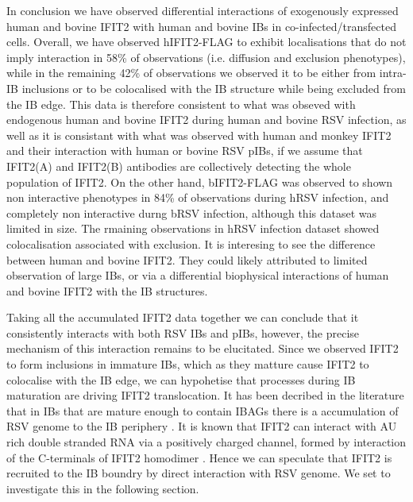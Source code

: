 In conclusion we have observed differential interactions of exogenously expressed human and bovine IFIT2 with human and bovine IBs in co-infected/transfected cells. Overall, we have observed hIFIT2-FLAG to exhibit localisations that do not imply interaction in 58\% of observations (i.e. diffusion and exclusion phenotypes), while in the remaining 42\% of observations we observed it to be either from intra-IB inclusions or to be colocalised with the IB structure while being excluded from the IB edge. This data is therefore consistent to what was obseved with endogenous human and bovine IFIT2 during human and bovine RSV infection, as well as it is consistant with what was observed with human and monkey IFIT2 and their interaction with human or bovine RSV pIBs, if we assume that IFIT2(A) and IFIT2(B) antibodies are collectively detecting the whole population of IFIT2. On the other hand, bIFIT2-FLAG was observed to shown non interactive phenotypes in 84\% of observations during hRSV infection, and completely non interactive durng bRSV infection, although this dataset was limited in size. The rmaining observations in hRSV infection dataset showed colocalisation associated with exclusion. It is interesing to see the difference between human and bovine IFIT2. They could likely attributed to limited observation of large IBs, or via a differential biophysical interactions of human and bovine IFIT2 with the IB structures.

Taking all the accumulated IFIT2 data together we can conclude that it consistently interacts with both RSV IBs and pIBs, however, the precise mechanism of this interaction remains to be elucitated. Since we observed IFIT2 to form inclusions in immature IBs, which as they matture cause IFIT2 to colocalise with the IB edge, we can hypohetise that processes during IB maturation are driving IFIT2 translocation. It has been decribed in the literature that in IBs that are mature enough to contain IBAGs there is a accumulation of RSV genome to the IB periphery \cite{Rincheval2017FunctionalVirus}. It is known that IFIT2 can interact with AU rich double stranded RNA via a positively charged channel, formed by interaction of the C-terminals of IFIT2 homodimer \cite{Yang2012CrystalMechanisms, Vladimer2014IFITs:Proteins}. Hence we can speculate that IFIT2 is recruited to the IB boundry by direct interaction with RSV genome. We set to investigate this in the following section.

